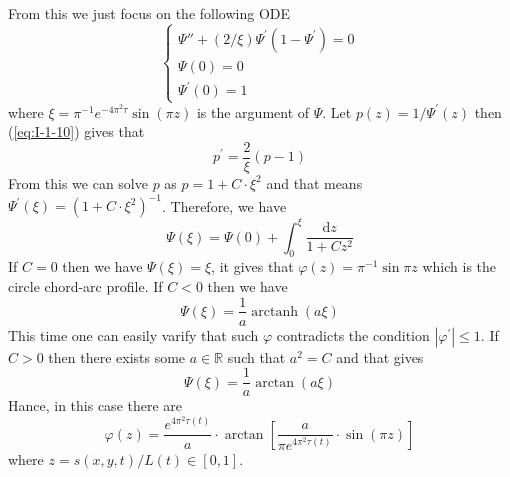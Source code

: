 From this we just focus on the following ODE
\begin{equation}\label{eq:I-1-10}
    \begin{cases}
        \Psi{''}+(2/\xi)\Psi^\prime(1-\Psi^\prime)=0\\
        \Psi(0)=0\\
        \Psi^\prime(0)=1
    \end{cases}
\end{equation}
where $\xi=\pi^{-1}e^{-4\pi^2\tau}\sin{(\pi z)}$ is the argument of $\Psi$. Let $p(z)=1/\Psi^{\prime}(z)$ then (\ref{eq:I-1-10}) gives that
\begin{equation*}
    p^\prime=\frac{2}{\xi}(p-1)
\end{equation*}
From this we can solve $p$ as $p=1+C\cdot\xi^2$ and that means $\Psi^\prime(\xi)={\left(1+C\cdot\xi^2\right)}^{-1}$. Therefore, we have
\begin{equation*}
    \Psi(\xi)=\Psi(0)+\int_{0}^{\xi}\frac{\mathrm{d}z}{1+C z^2}
\end{equation*}
If $C=0$ then we have $\Psi(\xi)=\xi$, it gives that $\varphi(z)=\pi^{-1}\sin{\pi z}$ which is the circle chord-arc profile. If $C<0$ then we have
\begin{equation*}
    \Psi(\xi)=\frac{1}{a}\operatorname{arctanh}{(a\xi)}
\end{equation*}
This time one can easily varify that such $\varphi$ contradicts the condition $\left|\varphi^\prime\right|\le 1$. If $C>0$ then there exists some $a\in\mathbb{R}$ such that $a^2=C$ and that gives
\begin{equation*}
    \Psi(\xi)=\frac{1}{a}\arctan{(a\xi)}
\end{equation*}
Hance, in this case there are
\begin{equation}\label{eq:I-1-11}
    \varphi(z)=\frac{e^{4\pi^2\tau{(t)}}}{a}\cdot\arctan{\left[\frac{a}{\pi e^{4\pi^2\tau{(t)}}}\cdot\sin{(\pi z)}\right]}
\end{equation}
where $z=s(x,y,t)/L(t)\in[0,1]$.

